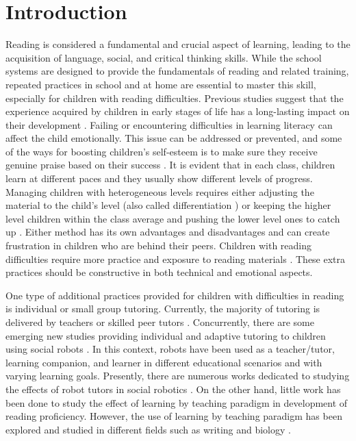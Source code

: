 \documentclass{sigchi}
\begin{document}
\section{Introduction}
Reading is considered a fundamental and crucial aspect of learning, leading to the acquisition of language, social, and critical thinking skills.
While the school systems are designed to provide the fundamentals of reading and related training, repeated practices in school and at home are essential to master this skill, especially for children with reading difficulties. 
Previous studies suggest that the experience acquired by children in early stages of life has a long-lasting impact on their development \cite{feldman2008early}. 
Failing or encountering difficulties in learning literacy can affect the child emotionally. 
This issue can be addressed or prevented, and some of the ways for boosting children's self-esteem is to make sure they receive genuine praise based on their success \cite{valiente2012linking}.
It is evident that in each class, children learn at different paces and they usually show different levels of progress. 
Managing children with heterogeneous levels requires either adjusting the material to the child's level (also called differentiation \cite{van1996isomorphism}) or keeping the higher level children within the class average and pushing the lower level ones to catch up \cite{schmeck2013learning}.
Either method has its own advantages and disadvantages and can create frustration in children who are behind their peers. 
Children with reading difficulties require more practice and exposure to reading materials \cite{reid2016dyslexia}. 
These extra practices should be constructive in both technical and emotional aspects. 

One type of additional practices provided for children with difficulties in reading is individual or small group tutoring. 
Currently, the majority of tutoring is delivered by teachers or skilled peer tutors \cite{wood1976role,goodlad1989peer,wenger2014artificial}. 
Concurrently, there are some emerging new studies providing individual and adaptive tutoring to children using social robots \cite{belpaeme2015l2tor,leyzberg2014personalizing,brown2013engaging}.
%
In this context, robots have been used as a teacher/tutor, learning companion, and learner in different educational scenarios and with varying learning goals.
Presently, there are numerous works dedicated to studying the effects of robot tutors in social robotics \cite{kanda2004interactive, castellano2009detecting,ribeiro2014m,kennedy2015robot}.
On the other hand, little work has been done to study the effect of learning by teaching paradigm in development of reading proficiency. 
However, the use of learning by teaching paradigm has been explored and studied in different fields such as writing and biology \cite{hood2015children,chase2009teachable}.
\end{document}
